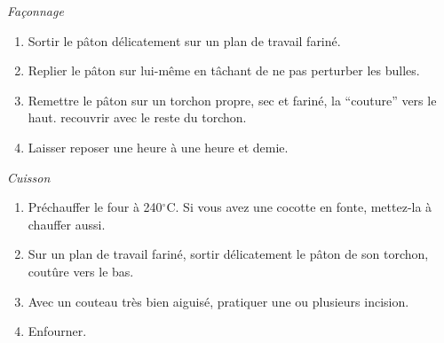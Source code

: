 \documentclass[9pt]{extarticle}
\begin{document}
\textit{Façonnage}
\begin{enumerate}[left=0pt,noitemsep]
    \item Sortir le pâton délicatement sur un plan de travail fariné.
    \item Replier le pâton sur lui-même en tâchant de ne pas perturber les bulles.
    \item Remettre le pâton sur un torchon propre, sec et fariné, la “couture” vers le haut. recouvrir avec le reste du torchon.
    \item Laisser reposer une heure à une heure et demie.
\end{enumerate}

\textit{Cuisson}
\begin{enumerate}[left=0pt,noitemsep]
    \item Préchauffer le four à 240$^\circ$C. Si vous avez une cocotte en fonte, mettez-la à chauffer aussi.
    \item Sur un plan de travail fariné, sortir délicatement le pâton de son torchon, coutûre vers le bas.
    \item Avec un couteau très bien aiguisé, pratiquer une ou plusieurs incision.
    \item Enfourner.
\end{enumerate}
\end{document}
